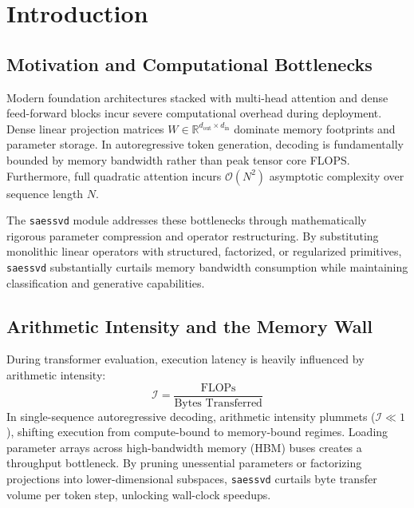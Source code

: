\section{Introduction}

\subsection{Motivation and Computational Bottlenecks}
Modern foundation architectures stacked with multi-head attention and dense feed-forward blocks incur severe computational overhead during deployment. Dense linear projection matrices $W \in \mathbb{R}^{d_{\text{out}} \times d_{\text{in}}}$ dominate memory footprints and parameter storage. In autoregressive token generation, decoding is fundamentally bounded by memory bandwidth rather than peak tensor core FLOPS. Furthermore, full quadratic attention incurs $\mathcal{O}(N^2)$ asymptotic complexity over sequence length $N$.

The \texttt{saessvd} module addresses these bottlenecks through mathematically rigorous parameter compression and operator restructuring. By substituting monolithic linear operators with structured, factorized, or regularized primitives, \texttt{saessvd} substantially curtails memory bandwidth consumption while maintaining classification and generative capabilities.

\subsection{Arithmetic Intensity and the Memory Wall}
During transformer evaluation, execution latency is heavily influenced by arithmetic intensity:
\[
\mathcal{I} = \frac{\text{FLOPs}}{\text{Bytes Transferred}}
\]
In single-sequence autoregressive decoding, arithmetic intensity plummets ($\mathcal{I} \ll 1$), shifting execution from compute-bound to memory-bound regimes. Loading parameter arrays across high-bandwidth memory (HBM) buses creates a throughput bottleneck. By pruning unessential parameters or factorizing projections into lower-dimensional subspaces, \texttt{saessvd} curtails byte transfer volume per token step, unlocking wall-clock speedups.

